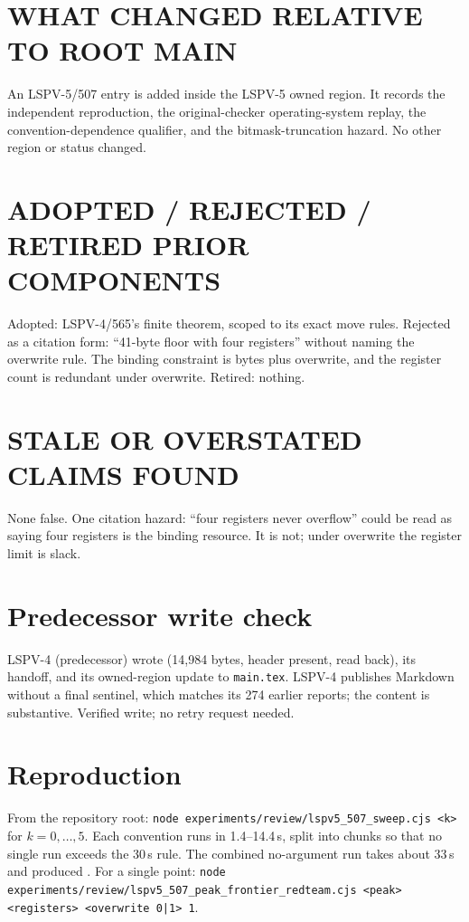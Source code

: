 \documentclass[11pt]{article}
\begin{document}
\section{WHAT CHANGED RELATIVE TO ROOT MAIN}
An LSPV-5/507 entry is added inside the LSPV-5 owned region.  It records the independent reproduction, the original-checker operating-system replay, the convention-dependence qualifier, and the bitmask-truncation hazard.  No other region or status changed.

\section{ADOPTED / REJECTED / RETIRED PRIOR COMPONENTS}
Adopted: LSPV-4/565's finite theorem, scoped to its exact move rules.  Rejected as a citation form: ``41-byte floor with four registers'' without naming the overwrite rule.  The binding constraint is bytes plus overwrite, and the register count is redundant under overwrite.  Retired: nothing.

\section{STALE OR OVERSTATED CLAIMS FOUND}
None false.  One citation hazard: ``four registers never overflow'' could be read as saying four registers is the binding resource.  It is not; under overwrite the register limit is slack.

\section{Predecessor write check}
LSPV-4 (predecessor) wrote  (14,984 bytes, header present, read back), its handoff, and its owned-region update to \texttt{main.tex}.  LSPV-4 publishes Markdown without a final sentinel, which matches its 274 earlier reports; the content is substantive.  Verified write; no retry request needed.

\section{Reproduction}
From the repository root: \texttt{node experiments/review/lspv5\_507\_sweep.cjs <k>} for $k=0,\dots,5$.  Each convention runs in 1.4--14.4\,s, split into chunks so that no single run exceeds the 30\,s rule.  The combined no-argument run takes about 33\,s and produced .  For a single point: \texttt{node experiments/review/lspv5\_507\_peak\_frontier\_redteam.cjs <peak> <registers> <overwrite 0|1> 1}.
\end{document}
